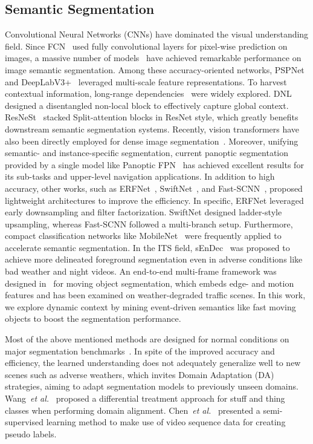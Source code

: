 \documentclass[journal]{IEEEtran}
\begin{document}
\subsection{Semantic Segmentation}
Convolutional Neural Networks (CNNs) have dominated the visual understanding field. Since FCN~\cite{long2015FCN} used fully convolutional layers for pixel-wise prediction on images, a massive number of models~\cite{zhao2017PSPNet}\cite{chen2018deeplabv3plus}\cite{yuan2019OCRNet}\cite{fu2019dual}\cite{yin2020dnl} have achieved remarkable performance on image semantic segmentation. Among these accuracy-oriented networks, PSPNet~\cite{zhao2017PSPNet} and DeepLabV3+~\cite{chen2018deeplabv3plus} leveraged multi-scale feature representations.
To harvest contextual information, long-range dependencies~\cite{yuan2019OCRNet}\cite{fu2019dual} were widely explored. DNL~\cite{yin2020dnl} designed a disentangled non-local block to effectively capture global context. ResNeSt~\cite{zhang2020resnest} stacked Split-attention blocks in ResNet style, which greatly benefits downstream semantic segmentation systems. {Recently, vision transformers have also been directly employed for dense image segmentation~\cite{setr}\cite{segformer}.} Moreover, unifying semantic- and instance-specific segmentation, current panoptic segmentation provided by a single model like Panoptic FPN~\cite{Kirillov2019PanopticFPN} has achieved excellent results for its sub-tasks and upper-level navigation applications.
In addition to high accuracy, other works, such as ERFNet~\cite{romera2017erfnet}, SwiftNet~\cite{orsic2019swiftnet}, and Fast-SCNN~\cite{poudel2019fastscnn}, proposed lightweight architectures to improve the efficiency. In specific, ERFNet leveraged early downsampling and filter factorization. SwiftNet designed ladder-style upsampling, {whereas} Fast-SCNN followed a multi-branch setup. Furthermore, compact classification networks like MobileNet~\cite{Howard_2019MobileNetV3} were frequently applied to accelerate semantic segmentation. 
In the ITS field, sEnDec~\cite{akilan2019sendec} was proposed to achieve more delineated foreground segmentation even in adverse conditions like bad weather and night videos. An end-to-end multi-frame framework was designed in~\cite{patil2020end} for moving object segmentation, which embeds edge- and motion features and has been examined on weather-degraded traffic scenes.
In this work, we explore dynamic context by mining event-driven semantics like fast moving objects to boost the segmentation performance.

Most of the above mentioned methods are designed for normal conditions on major segmentation benchmarks~\cite{cordts2016cityscapes}\cite{xie2016semantic}\cite{yu2020bdd100k}\cite{wang2019apolloscape}. In spite of the improved accuracy and efficiency, the learned understanding does not adequately generalize well to new scenes such as adverse weathers, which invites Domain Adaptation (DA) strategies, aiming to adapt segmentation models to previously unseen domains. {Wang~\textit{et al.}~\cite{wang2020differential} proposed a differential treatment approach for stuff and thing classes when performing domain alignment. Chen~\textit{et al.}~\cite{chen2020naive} presented a semi-supervised learning method to make use of video sequence data for creating pseudo labels.}
\end{document}
